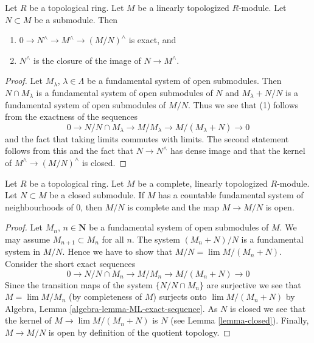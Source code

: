 \begin{lemma}
\label{lemma-closure}
Let $R$ be a topological ring. Let $M$ be a linearly topologized
$R$-module. Let $N \subset M$ be a submodule. Then
\begin{enumerate}
\item $0 \to N^\wedge \to M^\wedge \to (M/N)^\wedge$ is exact, and
\item $N^\wedge$ is the closure of the image of $N \to M^\wedge$.
\end{enumerate}
\end{lemma}

\begin{proof}
Let $M_\lambda$, $\lambda \in \Lambda$ be a fundamental system of
open submodules. Then $N \cap M_\lambda$ is a fundamental system
of open submodules of $N$ and $M_\lambda + N/N$ is a fundamental system
of open submodules of $M/N$. Thus we see that (1) follows from
the exactness of the sequences
$$
0 \to N/N \cap M_\lambda \to M/M_\lambda \to M/(M_\lambda + N) \to 0
$$
and the fact that taking limits commutes with limits. The second
statement follows from this and the fact that $N \to N^\wedge$
has dense image and that the kernel of $M^\wedge \to (M/N)^\wedge$ is closed.
\end{proof}

\begin{lemma}
\label{lemma-quotient-by-closed}
Let $R$ be a topological ring. Let $M$ be a complete, linearly topologized
$R$-module. Let $N \subset M$ be a closed submodule. If $M$ has a
countable fundamental system of neighbourhoods of $0$, then
$M/N$ is complete and the map $M \to M/N$ is open.
\end{lemma}

\begin{proof}
Let $M_n$, $n \in \mathbf{N}$ be a fundamental system of open submodules of $M$.
We may assume $M_{n + 1} \subset M_n$
for all $n$. The system $(M_n + N)/N$ is a fundamental system in $M/N$.
Hence we have to show that $M/N = \lim M/(M_n + N)$. Consider
the short exact sequences
$$
0 \to N/N \cap M_n \to M/M_n \to M/(M_n + N) \to 0
$$
Since the transition maps of the system $\{N/N\cap M_n\}$ are surjective
we see that $M = \lim M/M_n$ (by completeness of $M$) surjects onto
$\lim M/(M_n + N)$ by
Algebra, Lemma \ref{algebra-lemma-ML-exact-sequence}.
As $N$ is closed we see that the kernel of $M \to \lim M/(M_n + N)$
is $N$ (see Lemma \ref{lemma-closed}). Finally, $M \to M/N$
is open by definition of the quotient topology.
\end{proof}

